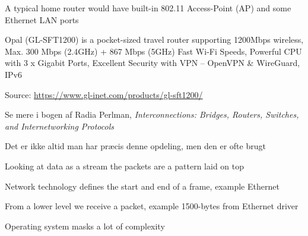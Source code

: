 \documentclass[Screen16to9,17pt]{foils}
\begin{document}


\begin{list1}
\item A typical home router would have built-in 802.11 Access-Point (AP) and some Ethernet LAN ports
\end{list1}



\begin{list2}
\item Opal (GL-SFT1200) is a pocket-sized travel router supporting 1200Mbps wireless,
Max. 300 Mbps (2.4GHz) + 867 Mbps (5GHz) Fast Wi-Fi Speeds, Powerful CPU with 3 x Gigabit Ports,
Excellent Security with VPN -- OpenVPN \& WireGuard, IPv6
\end{list2}
Source: \url{https://www.gl-inet.com/products/gl-sft1200/}




Se mere i bogen af Radia Perlman, \emph{Interconnections: Bridges, Routers, Switches, and Internetworking Protocols}



\centerline{Det er ikke altid man har præcis denne opdeling, men den er ofte brugt}





\begin{list1}
\item Looking at data as a stream the packets are a pattern laid on top
\item Network technology defines the start and end of a frame, example Ethernet
\item From a lower level we receive a packet, example 1500-bytes from Ethernet driver
\item Operating system masks a lot of complexity
\end{list1}





\end{document}
